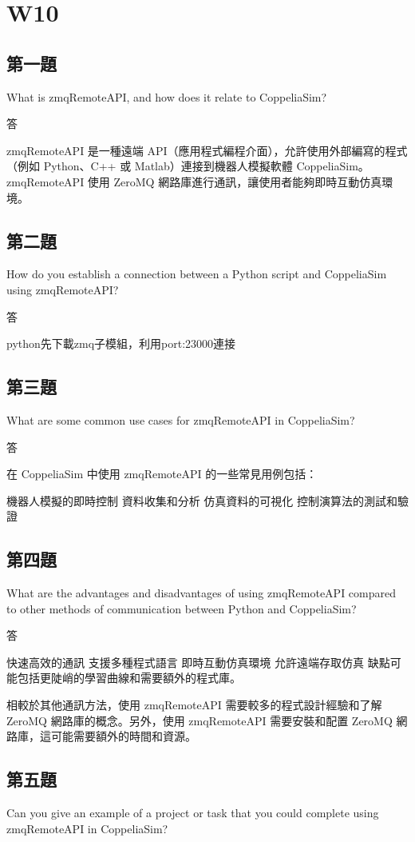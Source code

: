 \chapter{W10}
\section{第一題}
What is zmqRemoteAPI, and how does it relate to CoppeliaSim?

答

 zmqRemoteAPI 是一種遠端 API（應用程式編程介面），允許使用外部編寫的程式（例如 Python、C++ 或 Matlab）連接到機器人模擬軟體 CoppeliaSim。zmqRemoteAPI 使用 ZeroMQ 網路庫進行通訊，讓使用者能夠即時互動仿真環境。


\section{第二題}
How do you establish a connection between a Python script and CoppeliaSim using zmqRemoteAPI?

答

python先下載zmq子模組，利用port:23000連接


\section{第三題}
What are some common use cases for zmqRemoteAPI in CoppeliaSim?

答

在 CoppeliaSim 中使用 zmqRemoteAPI 的一些常見用例包括：

機器人模擬的即時控制
資料收集和分析
仿真資料的可視化
控制演算法的測試和驗證


\section{第四題}
What are the advantages and disadvantages of using zmqRemoteAPI compared to other methods of communication between Python and CoppeliaSim?

答

快速高效的通訊
支援多種程式語言
即時互動仿真環境
允許遠端存取仿真
缺點可能包括更陡峭的學習曲線和需要額外的程式庫。

相較於其他通訊方法，使用 zmqRemoteAPI 需要較多的程式設計經驗和了解 ZeroMQ 網路庫的概念。另外，使用 zmqRemoteAPI 需要安裝和配置 ZeroMQ 網路庫，這可能需要額外的時間和資源。

\section{第五題}
Can you give an example of a project or task that you could complete using zmqRemoteAPI in CoppeliaSim?

